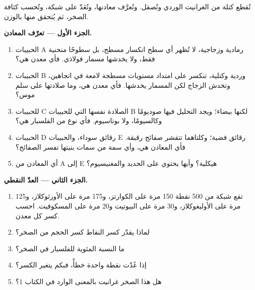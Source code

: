 \begin{problem}
\label{pb:g11:minerals:1}
تُقطع كتلة من الغرانيت الوردي وتُصقل. وتُعرَّف معادنها،
وتُعَدّ على شبكة، وتُحسب كثافة الصخر، ثم يُتحقق منها
بالوزن.

\medskip
\noindent\textbf{الجزء الأول --- تعرّف المعادن.}
\begin{enumerate}
  \item الحبيبات A رمادية وزجاجية، لا تُظهر أي سطح انكسار مسطح، بل
        سطوحًا منحنية فقط، ولا يخدشها مسمار فولاذي. فأي معدن
        هي؟
  \item الحبيبات B وردية وكتلية، تنكسر على امتداد مستويات مسطحة لامعة في
        اتجاهين، وتخدش الزجاج لكن المسمار يخدشها. فأي
        معدن هي، وما صلادتها على سلم موس؟
  \item للحبيبات C الصلادة  نفسها التي للحبيبات B لكنها
        بيضاء؛ ويجد التحليل فيها صوديومًا وكالسيومًا، ولا
        بوتاسيوم. فأي نوع من الفلسبار هي؟
  \item الحبيبات D رقائق سوداء، والحبيبات E رقائق فضية؛ وكلتاهما تتقشر
        صفائح رقيقة. فأي المعادن هي، وأي سمة من سمات
        بنيتها تفسر الصفائح؟
  \item أي المعادن من A إلى E  هيكلية؟ وأيها يحتوي على
        الحديد والمغنيسيوم؟
\end{enumerate}

\medskip
\noindent\textbf{الجزء الثاني --- العدّ النقطي.}
\begin{enumerate}[resume]
  \item تقع شبكة من 500 نقطة 150 مرة على الكوارتز، و175 مرة على
        الأورثوكلاز، و125 مرة على الأوليغوكلاز، و30 مرة على البيوتيت و20 مرة
        على المسكوفيت. احسب كسر كل معدن.
  \item لماذا يقدّر كسر النقاط كسر الحجم
        من الصخر؟
  \item ما النسبة المئوية للفلسبار في الصخر؟
  \item إذا عُدّت نقطة واحدة خطأً، فبكم يتغير الكسر؟
  \item هل هذا الصخر غرانيت بالمعنى الوارد في الكتاب 1؟
\end{enumerate}


\end{problem}
